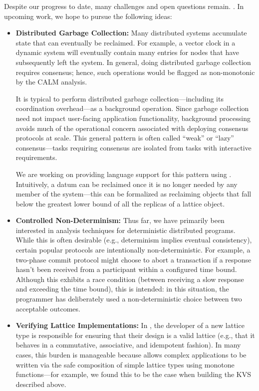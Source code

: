 Despite our progress to date, many challenges and open questions remain.  .  In upcoming work, we hope to pursue the following ideas:
\begin{itemize}
\item \textbf{Distributed Garbage Collection:} Many distributed systems
  accumulate state that can eventually be reclaimed. For example, a vector clock
  in a dynamic system will eventually contain many entries for nodes that have
  subsequently left the system. In general, doing distributed garbage collection
  requires consensus; hence, such operations would be flagged as non-monotonic
  by the CALM analysis.

  It is typical to perform distributed garbage collection---including its
  coordination overhead---as a background operation. Since garbage collection
  need not impact user-facing application functionality, background processing
  avoids much of the operational concern associated with deploying consensus
  protocols at scale. This general pattern is often called ``weak'' or ``lazy''
  consensus---tasks requiring consensus are isolated from tasks with interactive
  requirements.

  We are working on providing language support for this pattern using
  \blooml. Intuitively, a datum can be reclaimed once it is no longer needed by
  any member of the system---this can be formalized as reclaiming objects that
  fall below the greatest lower bound of all the replicas of a lattice object.  

\item \textbf{Controlled Non-Determinism:} Thus far, we have primarily been
  interested in analysis techniques for deterministic distributed
  programs. While this is often desirable (e.g., determinism implies eventual
  consistency), certain popular protocols are intentionally
  non-deterministic. For example, a two-phase commit protocol might choose to
  abort a transaction if a response hasn't been received from a participant
  within a configured time bound. Although this exhibits a race condition
  (between receiving a slow response and exceeding the time bound), this is
  intended: in this situation, the programmer has deliberately used a
  non-deterministic choice between two acceptable outcomes.


\item \textbf{Verifying Lattice Implementations:} In \blooml, the developer of a
  new lattice type is responsible for ensuring that their design is a valid
  lattice (e.g., that it behaves in a commutative, associative, and idempotent
  fashion). In many cases, this burden is manageable because \blooml allows
  complex applications to be written via the safe composition of simple lattice
  types using monotone functions---for example, we found this to be the case
  when building the KVS described above.


\end{itemize}
